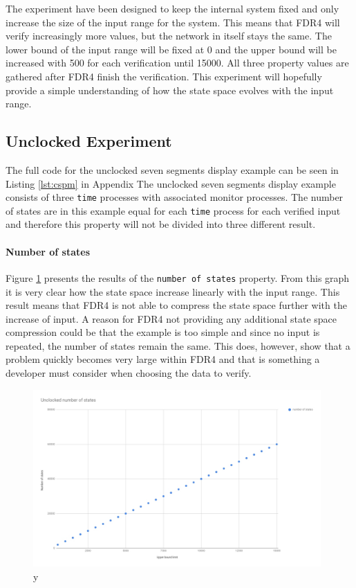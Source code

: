 The experiment have been designed to keep the internal system fixed and only increase the size of the input range for the system. This means that FDR4 will verify increasingly more values, but the network in itself stays the same.
The lower bound of the input range will be fixed at 0 and the upper bound will be increased with 500 for each verification until 15000. All three property values are gathered after FDR4 finish the verification.
This experiment will hopefully provide a simple understanding of how the state space evolves with the input range.
\subsection{Unclocked Experiment}
The full code for the unclocked seven segments display example can be seen in Listing \ref{lst:cspm} in Appendix %
The unclocked seven segments display example consists of three \texttt{time} processes with associated monitor processes. The number of states are in this example equal for each \texttt{time} process for each verified input and therefore this property will not be divided into three different result. 
\paragraph{Number of states}
Figure \ref{fig:unclocked_states} presents the results of the \texttt{number of states} property. From this graph it is very clear how the state space increase linearly with the input range. This result means that FDR4 is not able to compress the state space further with the increase of input. A reason for FDR4 not providing any additional state space compression could be that the example is too simple and since no input is repeated, the number of states remain the same. This does, however, show that a problem quickly becomes very large within FDR4 and that is something a developer must consider when choosing the data to verify.
\begin{figure}
    \includegraphics[width=0.98\textwidth]{./figures/15-11-2018/unclocked_number_of_states.jpg}
\caption{y}
\label{fig:unclocked_states}
\end{figure}
